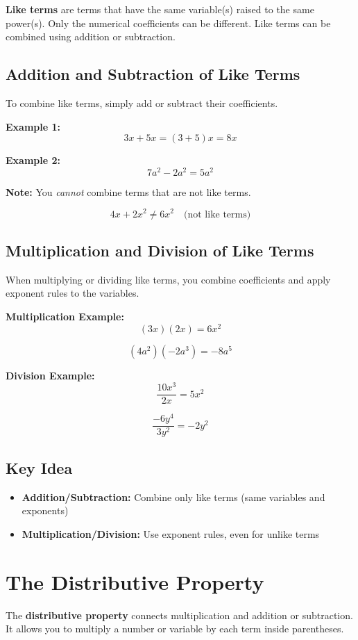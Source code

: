 \documentclass[11pt]{article}
\begin{document}
\textbf{Like terms} are terms that have the same variable(s) raised to the same power(s). Only the numerical coefficients can be different. Like terms can be combined using addition or subtraction.

\subsection{Addition and Subtraction of Like Terms}

To combine like terms, simply add or subtract their coefficients.

\textbf{Example 1:}
\[
3x + 5x = (3 + 5)x = 8x
\]

\textbf{Example 2:}
\[
7a^2 - 2a^2 = 5a^2
\]

\textbf{Note:} You \textit{cannot} combine terms that are not like terms.

\[
4x + 2x^2 \neq 6x^2
\quad \text{(not like terms)}
\]

\subsection{Multiplication and Division of Like Terms}

When multiplying or dividing like terms, you combine coefficients and apply exponent rules to the variables.

\textbf{Multiplication Example:}
\[
(3x)(2x) = 6x^2
\]

\[
(4a^2)(-2a^3) = -8a^5
\]

\textbf{Division Example:}
\[
\frac{10x^3}{2x} = 5x^2
\]

\[
\frac{-6y^4}{3y^2} = -2y^2
\]

\subsection*{Key Idea}

\begin{itemize}
  \item \textbf{Addition/Subtraction:} Combine only like terms (same variables and exponents)
  \item \textbf{Multiplication/Division:} Use exponent rules, even for unlike terms
\end{itemize}
\section{The Distributive Property}

The \textbf{distributive property} connects multiplication and addition or subtraction. It allows you to multiply a number or variable by each term inside parentheses.
\end{document}

